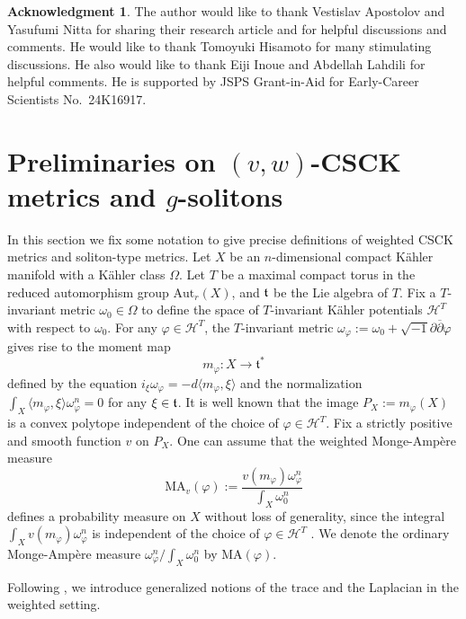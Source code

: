 \documentclass[12pt]{amsart}
\numberwithin{equation}{section}%
\theoremstyle{plain}
\theoremstyle{definition}
\newtheorem*{ackn}{\bf{Acknowledgment}}
\newcommand{\deldel}{\sqrt{-1}\partial \overline{\partial}}
\newcommand{\MA}{\mathrm{MA}}
\renewcommand{\phi}{\varphi}
\newcommand{\1}{\mathbf{1}}
\begin{document}
\begin{ackn}
The author would like to thank Vestislav Apostolov and Yasufumi Nitta for sharing
their research article and for helpful discussions and comments.
He would like to thank Tomoyuki Hisamoto for many stimulating discussions.
He also would like to thank Eiji Inoue and Abdellah Lahdili for helpful comments.
He is supported by JSPS Grant-in-Aid for Early-Career Scientists
No.~24K16917.
\end{ackn}
\section{Preliminaries on $(v,w)$-CSCK metrics and $g$-solitons}
\label{weighted section}
In this section we fix some notation to give precise definitions of
weighted CSCK metrics and soliton-type metrics.
Let $X$ be an $n$-dimensional compact K\"ahler manifold with a
K\"ahler class $\Omega$.
Let $T$ be a maximal compact torus in
the reduced automorphism group $\mathrm{Aut}_{r}(X)$,
and $\frak{t}$ be the Lie algebra of $T$.
Fix a $T$-invariant metric $\omega_{0}\in\Omega$ to define
the space of $T$-invariant K\"ahler potentials $\mathcal{H}^{T}$
with respect to $\omega_{0}$.
For any $\phi\in\mathcal{H}^{T}$,
the $T$-invariant metric $\omega_{\phi}:=\omega_{0}+\deldel\phi$
gives rise to the moment map
\begin{equation}
m_{\phi}:X\to\mathfrak{t}^{*}
\end{equation}
defined by the equation
$i_{\xi}\omega_{\phi}=-d\langle m_{\phi},\xi \rangle$ and
the normalization $\int_{X}\langle m_{\phi},\xi \rangle\omega_{\phi}^{n}=0$
for any $\xi\in\frak{t}$.
It is well known that the image $P_{X}:=m_{\phi}(X)$ is
a convex polytope
independent of the choice of $\phi\in\mathcal{H}^{T}$.
Fix a strictly positive and smooth function $v$ on $P_{X}$.
One can assume that
the weighted Monge-Amp\`ere measure
\begin{equation}
\MA_{v}(\phi):=\frac{v(m_{\phi})\omega_{\phi}^{n}}{\int_{X}\omega_{0}^{n}}
\end{equation}
defines a probability measure on $X$ without loss of generality,
since the integral $\int_{X}v(m_{\phi})\omega_{\phi}^{n}$
is independent of the choice of $\phi\in\mathcal{H}^{T}$ \cite{Lah19}.
We denote the ordinary Monge-Amp\`ere measure
$\omega_{\phi}^{n}/\int_{X}\omega_{0}^{n}$
by $\MA(\phi)$.

Following \cite{DJL24}, we introduce generalized notions of
the trace and the Laplacian in the weighted setting.
\end{document}
